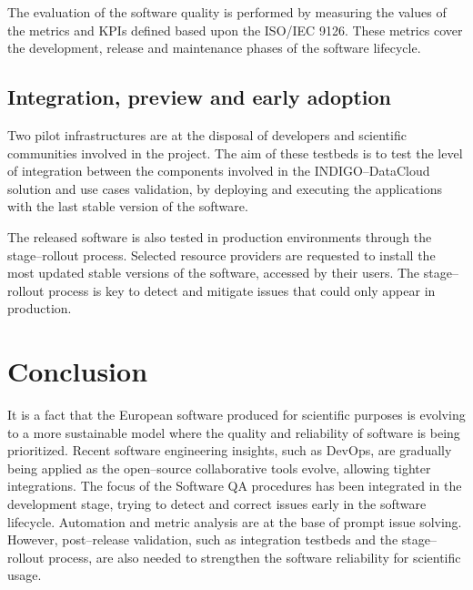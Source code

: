 \documentclass[journal]{IEEEtran}
\begin{document}


The evaluation of the software quality is performed by measuring the values of the metrics and KPIs defined based upon the ISO/IEC 9126. These metrics cover the development, release and maintenance phases of the software lifecycle.

\subsection{Integration, preview and early adoption}

Two pilot infrastructures are at the disposal of developers and scientific communities involved in the project. The aim of these testbeds is to test the level of integration between the components involved in the INDIGO--DataCloud solution and use cases validation, by deploying and executing the applications with the last stable version of the software.

The released software is also tested in production environments through the stage--rollout process. Selected resource providers are requested to install the most updated stable versions of the software, accessed by their users. The stage--rollout process is key to detect and mitigate issues that could only appear in production.

\section{Conclusion}

It is a fact that the European software produced for scientific purposes is evolving to a more sustainable model where the quality and reliability of software is being prioritized. Recent software engineering insights, such as DevOps, are gradually being applied as the open--source collaborative tools evolve, allowing tighter integrations. The focus of the Software QA procedures has been integrated in the development stage, trying to detect and correct issues early in the software lifecycle. Automation and metric analysis are at the base of prompt issue solving. However, post--release validation, such as integration testbeds and the stage--rollout process, are also needed to strengthen the software reliability for scientific usage.
\end{document}

